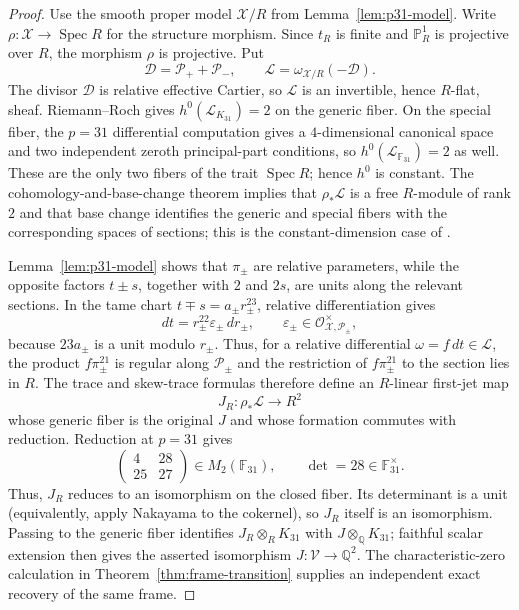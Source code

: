 \documentclass[11pt]{article}
\newcommand{\Q}{\mathbb Q}
\newcommand{\F}{\mathbb F}
\newcommand{\PP}{\mathbb P}
\begin{document}
\begin{proof}
Use the smooth proper model $\mathcal X/R$ from Lemma~\ref{lem:p31-model}.  Write $\rho:\mathcal X\to\operatorname{Spec}R$ for the structure morphism.  Since $t_R$ is finite and $\PP^1_R$ is projective over $R$, the morphism $\rho$ is projective.  Put
\[
\mathcal D=\mathcal P_++\mathcal P_-,\qquad
\mathcal L=\omega_{\mathcal X/R}(-\mathcal D).
\]
The divisor $\mathcal D$ is relative effective Cartier, so $\mathcal L$ is an invertible, hence $R$-flat, sheaf.  Riemann--Roch gives $h^0(\mathcal L_{K_{31}})=2$ on the generic fiber.  On the special fiber, the $p=31$ differential computation gives a $4$-dimensional canonical space and two independent zeroth principal-part conditions, so $h^0(\mathcal L_{\F_{31}})=2$ as well.  These are the only two fibers of the trait $\operatorname{Spec}R$; hence $h^0$ is constant.  The cohomology-and-base-change theorem implies that $\rho_*\mathcal L$ is a free $R$-module of rank $2$ and that base change identifies the generic and special fibers with the corresponding spaces of sections; this is the constant-dimension case of \cite[Theorem~III.12.11]{Hartshorne1977}.

Lemma~\ref{lem:p31-model} shows that $\pi_\pm$ are relative parameters, while the opposite factors $t\pm s$, together with $2$ and $2s$, are units along the relevant sections.  In the tame chart $t\mp s=a_\pm r_\pm^{23}$, relative differentiation gives
\[
dt=r_\pm^{22}\varepsilon_\pm\,dr_\pm,
\qquad \varepsilon_\pm\in\mathcal O_{\mathcal X,\mathcal P_\pm}^{\times},
\]
because $23a_\pm$ is a unit modulo $r_\pm$.  Thus, for a relative differential $\omega=f\,dt\in\mathcal L$, the product $f\pi_\pm^{21}$ is regular along $\mathcal P_\pm$ and the restriction of $f\pi_\pm^{21}$ to the section lies in $R$.  The trace and skew-trace formulas therefore define an $R$-linear first-jet map
\[
J_R:\rho_*\mathcal L\longrightarrow R^2
\]
whose generic fiber is the original $J$ and whose formation commutes with reduction.  Reduction at $p=31$ gives
\[
\begin{pmatrix}4&28\\25&27\end{pmatrix}\in M_2(\F_{31}),
\qquad \det=28\in\F_{31}^{\times}.
\]
Thus, $J_R$ reduces to an isomorphism on the closed fiber.  Its determinant is a unit (equivalently, apply Nakayama to the cokernel), so $J_R$ itself is an isomorphism.  Passing to the generic fiber identifies $J_R\otimes_R K_{31}$ with $J\otimes_{\Q}K_{31}$; faithful scalar extension then gives the asserted isomorphism $J:\mathcal V\to\Q^2$.  The characteristic-zero calculation in Theorem~\ref{thm:frame-transition} supplies an independent exact recovery of the same frame.
\end{proof}
\end{document}
